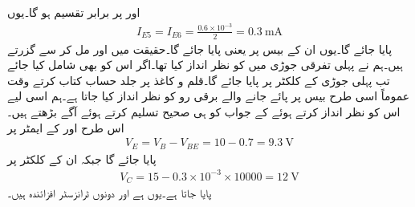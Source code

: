  اور  پر  برابر تقسیم ہو گا۔یوں
\begin{align*}
I_{E5}=I_{E6}=\frac{0.6 \times 10^{-3}}{2}=\SI{0.3}{\milli \ampere}
\end{align*}
پایا جائے گا۔یوں ان کے بیس پر  یعنی  پایا جائے گا۔حقیقت میں  اور  مل کر  سے گزرتے ہیں۔ہم نے پہلی تفرقی جوڑی میں  کو نظر انداز کیا تھا۔اگر اس کو بھی شامل کیا جائے تب پہلی جوڑی کے کلکٹر پر  پایا جائے گا۔قلم و کاغذ پر جلد حساب کتاب کرتے وقت عموماً اسی طرح بیس پر پائے جانے والے برقی رو کو نظر انداز کیا جاتا ہے۔ہم اسی لیے اس کو نظر انداز کرتے ہوئے  کے جواب کو ہی صحیح تسلیم کرتے ہوئے آگے بڑھتے ہیں۔اس طرح  اور  کے ایمٹر پر
\begin{align*}
V_{E}=V_{B}-V_{BE}=10-0.7=\SI{9.3}{\volt}
\end{align*}
پایا جائے گا جبکہ ان کے کلکٹر پر 
\begin{align*}
V_{C}=15 -0.3 \times 10^{-3} \times 10000=\SI{12}{\volt}
\end{align*}
پایا جاتا ہے۔یوں  ہے اور دونوں ٹرانزسٹر افزائندہ ہیں۔

